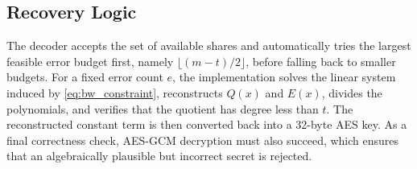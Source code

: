 \subsection{Recovery Logic}

The decoder accepts the set of available shares and automatically tries the largest feasible error budget first, namely $\lfloor (m-t)/2 \rfloor$, before falling back to smaller budgets. For a fixed error count $e$, the implementation solves the linear system induced by \eqref{eq:bw_constraint}, reconstructs $Q(x)$ and $E(x)$, divides the polynomials, and verifies that the quotient has degree less than $t$. The reconstructed constant term is then converted back into a 32-byte AES key. As a final correctness check, AES-GCM decryption must also succeed, which ensures that an algebraically plausible but incorrect secret is rejected.
